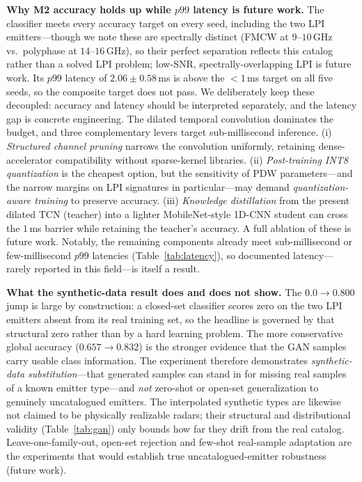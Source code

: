 \documentclass[journal]{IEEEtran}
\begin{document}
\textbf{Why M2 accuracy holds up while $p99$ latency is future work.} The classifier meets every
accuracy target on every seed, including the two LPI emitters---though we note these are
spectrally distinct (FMCW at $9$--$10$\,GHz vs.\ polyphase at $14$--$16$\,GHz), so their perfect
separation reflects this catalog rather than a solved LPI problem; low-SNR, spectrally-overlapping
LPI is future work. Its $p99$ latency of $2.06 \pm 0.58$\,ms is above the $<1$\,ms target on all
five seeds, so the composite target does not pass. We deliberately
keep these decoupled: accuracy and latency should be interpreted separately, and the latency gap is concrete
engineering. The dilated temporal convolution dominates the budget, and three complementary
levers target sub-millisecond inference. (i) \emph{Structured channel pruning} narrows the
convolution uniformly, retaining dense-accelerator compatibility without sparse-kernel libraries.
(ii) \emph{Post-training INT8 quantization} is the cheapest option, but the sensitivity of PDW
parameters---and the narrow margins on LPI signatures in particular---may demand
\emph{quantization-aware training} to preserve accuracy. (iii) \emph{Knowledge distillation} from
the present dilated TCN (teacher) into a lighter MobileNet-style 1D-CNN student can cross the
$1$\,ms barrier while retaining the teacher's accuracy. A full ablation of these is future work.
Notably, the remaining components already meet sub-millisecond or few-millisecond $p99$ latencies
(Table~\ref{tab:latency}), so documented latency---rarely reported in this field---is itself a
result.

\textbf{What the synthetic-data result does and does not show.} The $0.0\!\to\!0.800$ jump is
large by construction: a closed-set classifier scores zero on the two LPI emitters absent from its
real training set,
so the headline is governed by that structural zero rather than by a hard learning problem. The
more conservative global accuracy ($0.657\!\to\!0.832$) is the stronger evidence that the GAN
samples carry usable class information. The experiment therefore demonstrates
\emph{synthetic-data substitution}---that generated samples can stand in for missing real samples
of a known emitter type---and \emph{not} zero-shot or open-set generalization to genuinely
uncatalogued emitters. The interpolated synthetic types are likewise not claimed to be physically
realizable radars; their structural and distributional validity (Table~\ref{tab:gan}) only bounds
how far they drift from the real catalog. Leave-one-family-out, open-set rejection and few-shot
real-sample adaptation are the experiments that would establish true uncatalogued-emitter
robustness (future work).
\end{document}
